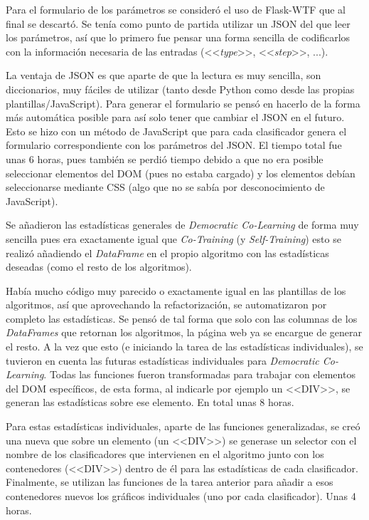 Para el formulario de los parámetros se consideró el uso de Flask-WTF que al
final se descartó. Se tenía como punto de partida utilizar un JSON del que leer
los parámetros, así que lo primero fue pensar una forma sencilla de codificarlos
con la información necesaria de las entradas (<<\textit{type}>>,
<<\textit{step}>>, ...). 

La ventaja de JSON es que aparte de que la lectura es muy sencilla, son
diccionarios, muy fáciles de utilizar (tanto desde Python como desde las propias
plantillas/JavaScript). Para generar el formulario se pensó en hacerlo de la
forma más automática posible para así solo tener que cambiar el JSON en el
futuro. Esto se hizo con un método de JavaScript que para cada clasificador
genera el formulario correspondiente con los parámetros del JSON. El tiempo
total fue unas 6 horas, pues también se perdió tiempo debido a que no era
posible seleccionar elementos del DOM (pues no estaba cargado) y los elementos
debían seleccionarse mediante CSS (algo que no se sabía por desconocimiento de
JavaScript).

Se añadieron las estadísticas generales de \textit{Democratic Co-Learning} de
forma muy sencilla pues era exactamente igual que \textit{Co-Training} (y
\textit{Self-Training}) esto se realizó añadiendo el \textit{DataFrame} en el
propio algoritmo con las estadísticas deseadas (como el resto de los
algoritmos).

Había mucho código muy parecido o exactamente igual en las plantillas de los
algoritmos, así que aprovechando la refactorización, se automatizaron por
completo las estadísticas. Se pensó de tal forma que solo con las columnas de
los \textit{DataFrames} que retornan los algoritmos, la página web ya se
encargue de generar el resto. A la vez que esto (e iniciando la tarea de las
estadísticas individuales), se tuvieron en cuenta las futuras estadísticas
individuales para \textit{Democratic Co-Learning}. Todas las funciones fueron
transformadas para trabajar con elementos del DOM específicos, de esta forma, al
indicarle por ejemplo un <<DIV>>, se generan las estadísticas sobre ese
elemento. En total unas 8 horas. 

Para estas estadísticas individuales, aparte de las funciones generalizadas, se
creó una nueva que sobre un elemento (un <<DIV>>) se generase un selector con el
nombre de los clasificadores que intervienen en el algoritmo junto con los
contenedores (<<DIV>>) dentro de él para las estadísticas de cada clasificador.
Finalmente, se utilizan las funciones de la tarea anterior para añadir a esos
contenedores nuevos los gráficos individuales (uno por cada clasificador). Unas
4 horas.

